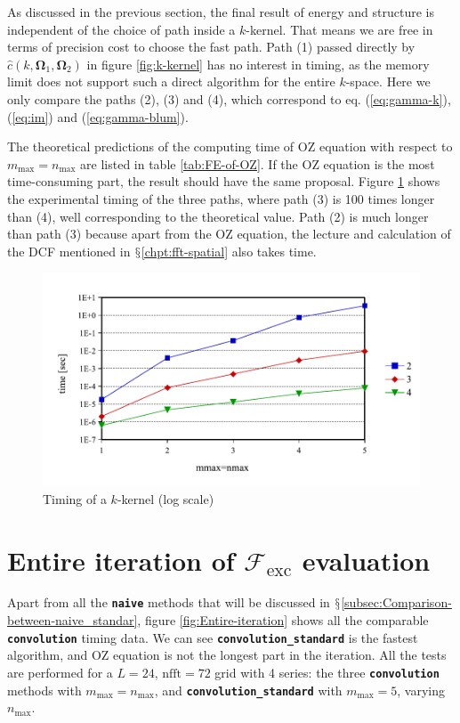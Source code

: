 As discussed in the previous section, the final result of energy and
structure is independent of the choice of path inside a $k$-kernel.
That means we are free in terms of precision cost to choose the fast
path. Path (1) passed directly by $\hat{c}(k,\mathbf{\Omega}_{1},\mathbf{\Omega}_{2})$
in figure \ref{fig:k-kernel} has no interest in timing, as the memory
limit does not support such a direct algorithm for the entire $k$-space.
Here we only compare the paths (2), (3) and (4), which correspond
to eq. (\ref{eq:gamma-k}), (\ref{eq:im}) and (\ref{eq:gamma-blum}).

The theoretical predictions of the computing time of \acs{OZ} equation
with respect to $m_{\max}=n_{\max}$ are listed in table \ref{tab:FE-of-OZ}.
If the \acs{OZ} equation is the most time-consuming part, the result
should have the same proposal. Figure \ref{fig:Timing-k-kernel} shows
the experimental timing of the three paths, where path (3) is 100
times longer than (4), well corresponding to the theoretical value.
Path (2) is much longer than path (3) because apart from the \acs{OZ}
equation, the lecture and calculation of the \acs{DCF} mentioned
in $\mathsection$\ref{chpt:fft-spatial} also takes time.

\begin{figure}[H]
\begin{centering}
\includegraphics[bb=0bp 20bp 453bp 236bp,width=0.7\columnwidth]{_figure/results/k-kernel}
\par\end{centering}
\caption[Timing of a $k$-kernel]{Timing of a $k$-kernel (log scale)\label{fig:Timing-k-kernel}}
\end{figure}


\section{Entire iteration of $\mathcal{F}_{\mathrm{exc}}$ evaluation}

Apart from all the \texttt{\textbf{naive}} methods that will be discussed
in $\mathsection$\ref{subsec:Comparison-between-naive_standar},
figure \ref{fig:Entire-iteration} shows all the comparable \texttt{\textbf{convolution}}
timing data. We can see \texttt{\textbf{convolution\_standard}} is
the fastest algorithm, and \acs{OZ} equation is not the longest part
in the iteration. All the tests are performed for a $L=24$, $\mathrm{nfft}=72$
grid with 4 series: the three \texttt{\textbf{convolution}} methods
with $m_{\max}=n_{\max}$, and \texttt{\textbf{convolution\_standard}}
with $m_{\max}=5$, varying $n_{\max}$.

